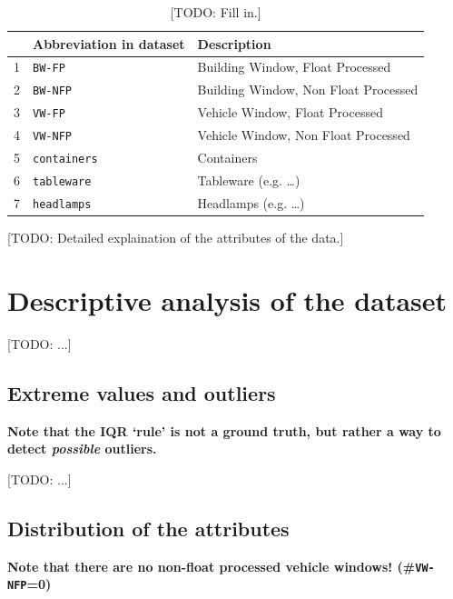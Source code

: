 \documentclass[dtu]{dtuarticle}
\newcommand{\todo}[1]{\color{red}[TODO: #1]\color{black}}
\begin{document}
	\begin{table}
		\centering
		\begin{tabular}{r|l|l}
			\textbf{} & \textbf{Abbreviation in dataset} & \textbf{Description}                 \\ \hline\hline
			        1 & \texttt{BW-FP}                   & Building Window, Float Processed     \\ \hline
			        2 & \texttt{BW-NFP}                  & Building Window, Non Float Processed \\ \hline
			        3 & \texttt{VW-FP}                   & Vehicle Window, Float Processed      \\ \hline
			        4 & \texttt{VW-NFP}                  & Vehicle Window, Non Float Processed  \\ \hline
			        5 & \texttt{containers}              & Containers                           \\ \hline
			        6 & \texttt{tableware}               & Tableware (e.g. \dots)               \\ \hline
			        7 & \texttt{headlamps}               & Headlamps (e.g. \dots)
		\end{tabular}
		\caption{\todo{Fill in.}}
		\label{table:types}
	\end{table}

	\todo{Detailed explaination of the attributes of the data.}

	\section{Descriptive analysis of the dataset}

	\todo{...}

	\subsection{Extreme values and outliers}

	\textbf{Note that the IQR `rule' is not a ground truth, but rather a way to detect \textit{possible} outliers.}

	\todo{...}

	\subsection{Distribution of the attributes}
	\label{section:distribution}

	\textbf{Note that there are no non-float processed vehicle windows! (\#\texttt{VW-NFP}=0)}
\end{document}
